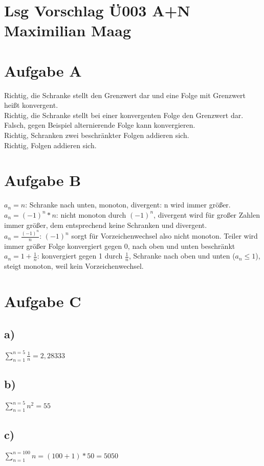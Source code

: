 \documentclass{article}
\begin{document}
	\section*{Lsg Vorschlag Ü003 A+N Maximilian Maag}
	\section*{Aufgabe A}
	Richtig, die Schranke stellt den Grenzwert dar und eine Folge mit Grenzwert heißt konvergent. \\
	Richtig, die Schranke stellt bei einer konvergenten Folge den Grenzwert dar.
	Falsch, gegen Beispiel alternierende Folge kann konvergieren. \\
	Richtig, Schranken zwei beschränkter Folgen addieren sich. \\
	Richtig, Folgen addieren sich. \\
	
	\section*{Aufgabe B}
	$a_{n} = n$:  Schranke nach unten, monoton, divergent: n wird immer größer. \\
	$a_{n} = (-1)^{n} * n$: nicht monoton durch $(-1)^{n}$, divergent wird für großer Zahlen immer größer, dem entsprechend keine Schranken und divergent. \\
	$a_{n} = \frac{(-1)^{n}}{n}$: $(-1)^{n}$ sorgt für Vorzeichenwechsel also nicht monoton. Teiler wird immer größer Folge konvergiert gegen 0, nach oben und unten beschränkt \\
	$a_{n} = 1 + \frac{1}{n}$: konvergiert gegen 1 durch $\frac{1}{n}$, Schranke nach oben und unten ($a_{n} \leq 1$), steigt monoton, weil kein Vorzeichenwechsel.
	\section*{Aufgabe C}
	\subsection*{a)}
	$\sum\limits_{n=1}^{n=5} \frac{1}{n} = 2,28333$
	\subsection*{b)}
	$\sum\limits_{n=1}^{n=5} n^{2} = 55$
	\subsection*{c)}
	$\sum\limits_{n=1}^{n=100} n = (100 + 1) * 50  = 5050$
\end{document}
